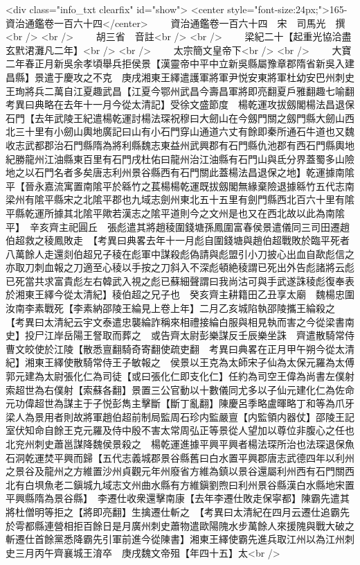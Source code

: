 <div class="info_txt clearfix" id="show">
<center style="font-size:24px;">165-資治通鑑卷一百六十四</center>
  　　資治通鑑卷一百六十四　宋　司馬光　撰<br />
<br />
　　胡三省　音註<br />
<br />
　　梁紀二十【起重光協洽盡玄黓涒灘凡二年】<br />
<br />
　　太宗簡文皇帝下<br />
<br />
　　大寶二年春正月新吳余孝頃舉兵拒侯景【漢靈帝中平中立新吳縣屬豫章郡隋省新吳入建昌縣】景遣于慶攻之不克　庚戌湘東王繹遣護軍將軍尹悦安東將軍杜幼安巴州刺史王珣將兵二萬自江夏趣武昌【江夏今鄂州武昌今壽昌軍將即亮翻夏戶雅翻趣七喻翻　考異曰典略在去年十一月今從太清記】受徐文盛節度　楊乾運攻拔劔閣楊法昌退保石門【去年武陵王紀遣楊乾運討楊法琛祝穆曰大劒山在今劔門關之劔門縣大劒山西北三十里有小劒山輿地廣記曰山有小石門穿山通道六丈有餘即秦所通石牛道也又魏收志武都郡治石門縣隋為將利縣魏志東益州武興郡有石門縣仇池郡有西石門縣輿地紀勝龍州江油縣東百里有石門戌杜佑曰龍州治江油縣有石門山與氐分界蓋蜀多山險地之以石門名者多矣唐志利州景谷縣西有石門關此蓋楊法昌退保之地】乾運據南隂平【晉永嘉流寓置南隂平於緜竹之萇楊楊乾運既拔劔閣無緣棄險退據緜竹五代志南梁州有隂平縣宋之北隂平郡也九域志劍州東北五十五里有劍門縣西北百六十里有隂平縣乾運所據其北隂平歟若漢志之隂平道則今之文州是也又在西北故以此為南隂平】　辛亥齊主祀圓丘　張彪遣其將趙稜圍錢塘孫鳳圍富春侯景遣儀同三司田遷趙伯超救之稜鳳敗走　【考異曰典畧去年十一月彪自圍錢塘與趙伯超戰敗於臨平死者八萬餘人走還剡伯超兄子稜在彪軍中謀殺彪偽請與彪盟引小刀披心出血自歃彪信之亦取刀刺血報之刀適至心稜以手按之刀斜入不深彪頓絶稜謂已死出外告彪諸將云彪已死當共求富貴彪左右韓武入視之彪已蘇細聲謂曰我尚沽可與手武遂誅稜彪復奉表於湘東王繹今從太清紀】稜伯超之兄子也　癸亥齊主耕籍田乙丑享太廟　魏楊忠圍汝南李素戰死【李素納邵陵王綸見上卷上年】二月乙亥城陷執邵陵攜王綸殺之　【考異曰太清紀云宇文泰遣忠襲綸詐稱來相禮接綸白服與相見執而害之今從梁書南史】投尸江岸岳陽王詧取而葬之　或告齊太尉彭樂謀反壬辰樂坐誅　齊遣散騎常侍曹文皎使於江陵【散悉亶翻騎奇寄翻使疏吏翻　考異曰典畧在正月甲午朔今從太清紀】湘東王繹使散騎常侍王子敏報之　侯景以王克為太師宋子仙為太保元羅為太傅郭元建為太尉張化仁為司徒【或曰張化仁即支化仁】任約為司空王偉為尚書左僕射索超世為右僕射【索蘇各翻】景置三公官動以十數儀同尤多以子仙元建化仁為佐命元功偉超世為謀主于子悦彭雋主擊斷【斷丁亂翻】陳慶呂季略盧暉略丁和等為爪牙梁人為景用者則故將軍趙伯超前制局監周石珍内監嚴亶【内監領内器仗】邵陵王記室伏知命自餘王克元羅及侍中殷不害太常周弘正等景從人望加以尊位非腹心之任也　北兖州刺史蕭邕謀降魏侯景殺之　楊乾運進據平興平興者楊法琛所治也法琛退保魚石洞乾運焚平興而歸【五代志義城郡景谷縣舊曰白水置平興郡唐志武德四年以利州之景谷及龍州之方維置沙州貞觀元年州廢省方維為鎮以景谷還屬利州西有石門關西北有白埧魚老二鎭城九域志文州曲水縣有方維鎭劉煦曰利州景谷縣漢白水縣地宋置平興縣隋為景谷縣】　李遷仕收衆還擊南康【去年李遷仕敗走保寜都】陳霸先遣其將杜僧明等拒之【將即亮翻】生擒遷仕斬之　【考異曰太清紀在四月云遷仕追霸先於雩都縣連營相拒百餘日是月廣州刺史蕭物遣歐陽隗水步萬餘人來援隗與戰大破之斬遷仕首餘黨悉降霸先引軍前進今從陳書】湘東王繹使霸先進兵取江州以為江州刺史三月丙午齊襄城王淯卒　庚戌魏文帝殂【年四十五】太<br />
